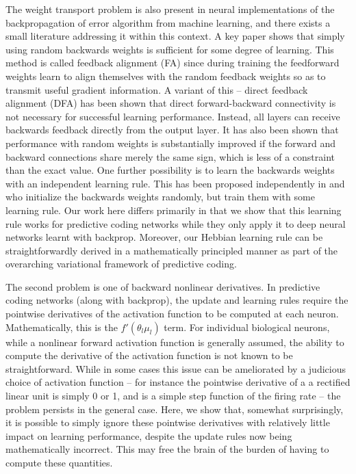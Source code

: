 The weight transport problem is also present in neural implementations of the backpropagation of error algorithm from machine learning, and there exists a small literature addressing it within this context. A key paper \citep{lillicrap2014random,lillicrap2016random} shows that simply using random backwards weights is sufficient for some degree of learning. This method is called feedback alignment (FA) since during training the feedforward weights learn to align themselves with the random feedback weights so as to transmit useful gradient information. A variant of this -- direct feedback alignment (DFA) \citep{nokland2016direct} has been shown that direct forward-backward connectivity is not necessary for successful learning performance. Instead, all layers can receive backwards feedback directly from the output layer. It has also been shown \citep{liao2016important} that performance with random weights is substantially improved if the forward and backward connections share merely the same sign, which is less of a constraint than the exact value. One further possibility is to learn the backwards weights with an independent learning rule. This has been proposed independently in \citet{amit2019deep} and \citet{akrout2019deep} who initialize the backwards weights randomly, but train them with some learning rule. Our work here differs primarily in that we show that this learning rule works for predictive coding networks while they only apply it to deep neural networks learnt with backprop. Moreover, our Hebbian learning rule can be straightforwardly derived in a mathematically principled manner as part of the overarching variational framework of predictive coding. 

The second problem is one of backward nonlinear derivatives. In predictive coding networks (along with backprop), the update and learning rules require the pointwise derivatives of the activation function to be computed at each neuron. Mathematically, this is the $f'(\theta_l \mu_l)$ term. For individual biological neurons, while a nonlinear forward activation function is generally assumed, the ability to compute the derivative of the activation function is not known to be straightforward. While in some cases this issue can be ameliorated by a judicious choice of activation function -- for instance the pointwise derivative of a a rectified linear unit is simply 0 or 1, and is a simple step function of the firing rate -- the problem persists in the general case. Here, we show that, somewhat surprisingly, it is possible to simply ignore these pointwise derivatives with relatively little impact on learning performance, despite the update rules now being mathematically incorrect. This may free the brain of the burden of having to compute these quantities.

